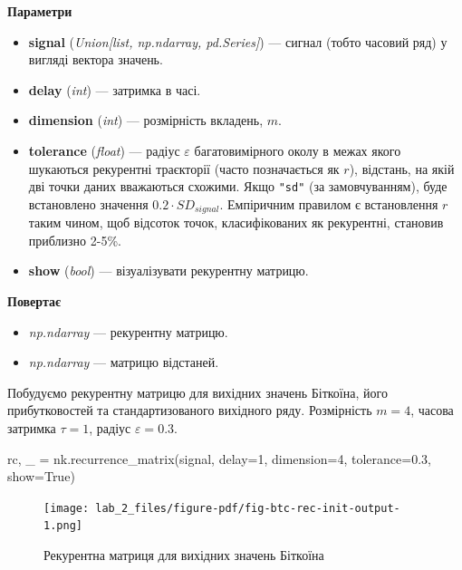 \documentclass[
  letterpaper,
]{report}
\newenvironment{Shaded}{\begin{snugshade}}{\end{snugshade}}
\newcommand{\DecValTok}[1]{\textcolor[rgb]{0.68,0.00,0.00}{#1}}
\newcommand{\FloatTok}[1]{\textcolor[rgb]{0.68,0.00,0.00}{#1}}
\newcommand{\NormalTok}[1]{\textcolor[rgb]{0.00,0.23,0.31}{#1}}
\newcommand{\OperatorTok}[1]{\textcolor[rgb]{0.37,0.37,0.37}{#1}}
\newcommand{\VariableTok}[1]{\textcolor[rgb]{0.07,0.07,0.07}{#1}}
\providecommand{\tightlist}{%
  \setlength{\itemsep}{0pt}\setlength{\parskip}{0pt}}\usepackage{longtable,booktabs,array}
\begin{document}
\textbf{Параметри}

\begin{itemize}
\tightlist
\item
  \textbf{signal} (\emph{Union{[}list, np.ndarray, pd.Series{]}}) ---
  сигнал (тобто часовий ряд) у вигляді вектора значень.
\item
  \textbf{delay} (\emph{int}) --- затримка в часі.
\item
  \textbf{dimension} (\emph{int}) --- розмірність вкладень, \(m\).
\item
  \textbf{tolerance} (\emph{float}) --- радіус \(\varepsilon\)
  багатовимірного околу в межах якого шукаються рекурентні траєкторії
  (часто позначається як \(r\)), відстань, на якій дві точки даних
  вважаються схожими. Якщо \texttt{"sd"} (за замовчуванням), буде
  встановлено значення \(0.2 \cdot SD_{signal}\). Емпіричним правилом є
  встановлення \(r\) таким чином, щоб відсоток точок, класифікованих як
  рекурентні, становив приблизно 2-5\%.
\item
  \textbf{show} (\emph{bool}) --- візуалізувати рекурентну матрицю.
\end{itemize}

\textbf{Повертає}

\begin{itemize}
\tightlist
\item
  \emph{np.ndarray} --- рекурентну матрицю.
\item
  \emph{np.ndarray} --- матрицю відстаней.
\end{itemize}

Побудуємо рекурентну матрицю для вихідних значень Біткоїна, його
прибутковостей та стандартизованого вихідного ряду. Розмірність \(m=4\),
часова затримка \(\tau=1\), радіус \(\varepsilon=0.3\).

\begin{Shaded}
\begin{Highlighting}[]
\NormalTok{rc, \_ }\OperatorTok{=}\NormalTok{ nk.recurrence\_matrix(signal, }
\NormalTok{                            delay}\OperatorTok{=}\DecValTok{1}\NormalTok{, }
\NormalTok{                            dimension}\OperatorTok{=}\DecValTok{4}\NormalTok{, }
\NormalTok{                            tolerance}\OperatorTok{=}\FloatTok{0.3}\NormalTok{,}
\NormalTok{                            show}\OperatorTok{=}\VariableTok{True}\NormalTok{)}
\end{Highlighting}
\end{Shaded}

\begin{figure}[H]

{\centering \texttt{[image: lab\_2\_files/figure-pdf/fig-btc-rec-init-output-1.png]}

}

\caption{\label{fig-btc-rec-init}Рекурентна матриця для вихідних значень
Біткоїна}

\end{figure}
\end{document}
